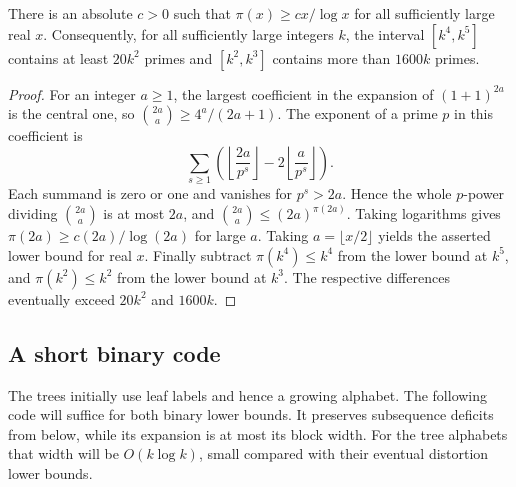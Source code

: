 \begin{lemma}\label{lem:primes}
There is an absolute $c>0$ such that
$\pi(x)\geq cx/\log x$ for all sufficiently large real $x$.
Consequently, for all sufficiently large integers $k$, the interval
$[k^4,k^5]$ contains at least $20k^2$ primes and $[k^2,k^3]$ contains
more than $1600k$ primes.
\end{lemma}
\begin{proof}
For an integer $a\geq1$, the largest coefficient in the expansion of
$(1+1)^{2a}$ is the central one, so
$\binom{2a}{a}\geq4^a/(2a+1)$. The exponent of a prime $p$ in this
coefficient is
\[
 \sum_{s\geq1}
 \left(\left\lfloor\frac{2a}{p^s}\right\rfloor
 -2\left\lfloor\frac a{p^s}\right\rfloor\right).
\]
Each summand is zero or one and vanishes for $p^s>2a$. Hence the whole
$p$-power dividing $\binom{2a}{a}$ is at most $2a$, and
$\binom{2a}{a}\leq(2a)^{\pi(2a)}$. Taking logarithms gives
$\pi(2a)\geq c(2a)/\log(2a)$ for large $a$. Taking
$a=\lfloor x/2\rfloor$ yields the asserted lower bound for real $x$.
Finally subtract $\pi(k^4)\leq k^4$ from the lower bound at $k^5$,
and $\pi(k^2)\leq k^2$ from the lower bound at $k^3$. The respective
differences eventually exceed $20k^2$ and $1600k$.
\end{proof}

\subsection{A short binary code}

The trees initially use leaf labels and hence a growing alphabet. The
following code will suffice for both binary lower bounds. It preserves
subsequence deficits from below, while its expansion is at most its
block width. For the tree alphabets that width will be $O(k\log k)$,
small compared with their eventual distortion lower bounds.

